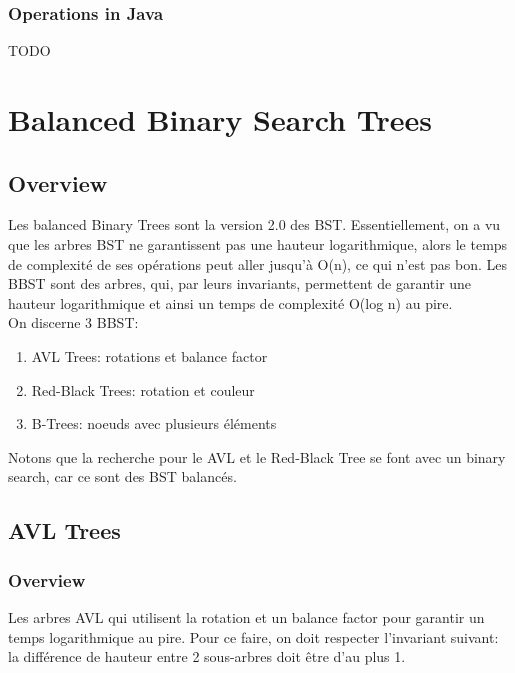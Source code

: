 \documentclass{article}
\begin{document}
\subsubsection{Operations in Java}%
\label{ssub:Operations in Java}

TODO

\section{Balanced Binary Search Trees}

\subsection{Overview}%
\label{sub:Overview}

Les balanced Binary Trees sont la version 2.0 des BST. Essentiellement,
on a vu que les arbres BST ne garantissent pas une hauteur logarithmique,
alors le temps de complexité de ses opérations peut aller jusqu'à O(n),
ce qui n'est pas bon. Les BBST sont des arbres, qui, par leurs invariants,
permettent de garantir une hauteur logarithmique et ainsi un temps
de complexité O(log n) au pire.\\

On discerne 3 BBST:
\begin{enumerate}
    \item AVL Trees: rotations et balance factor
    \item Red-Black Trees: rotation et couleur
    \item B-Trees: noeuds avec plusieurs éléments
\end{enumerate}

Notons que la recherche pour le AVL et le Red-Black Tree se font avec
un binary search, car ce sont des BST balancés.

\subsection{AVL Trees}

\subsubsection{Overview}%
\label{ssub:Overview}

Les arbres AVL qui utilisent la rotation et un balance factor pour
garantir un temps logarithmique au pire. Pour ce faire, on doit
respecter l'invariant suivant: la différence de hauteur entre 2
sous-arbres doit être d'au plus 1.
\end{document}
